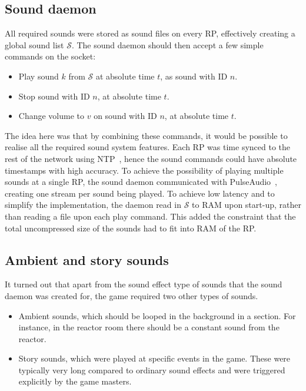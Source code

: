 \subsection{Sound daemon}

All required sounds were stored as sound files on every RP,
effectively creating a global sound list $\mathcal{S}$. The sound
daemon should then accept a few simple commands on the socket:
\begin{itemize}
\item Play sound $k$ from $\mathcal{S}$ at absolute time $t$, as sound with ID $n$.
\item Stop sound with ID $n$, at absolute time $t$.
\item Change volume to $v$ on sound with ID $n$, at absolute time $t$.
\end{itemize}

The idea here was that by combining these commands, it would be
possible to realise all the required sound system features. Each RP was time
synced to the rest of the network using NTP~\cite{ntp}, hence the
sound commands could have absolute timestamps with high accuracy. To
achieve the possibility of playing multiple sounds at a single RP, the
sound daemon communicated with PulseAudio~\cite{pulseaudio}, creating
one stream per sound being played. To achieve low latency and to
simplify the implementation, the daemon read in $\mathcal{S}$ to RAM
upon start-up, rather than reading a file upon each play command. This
added the constraint that the total uncompressed size of the sounds
had to fit into RAM of the RP\@.

\subsection{Ambient and story sounds}

It turned out that apart from the sound effect type of sounds that
the sound daemon was created for, the game required two other types of sounds.
\begin{itemize}
\item Ambient sounds, which should be looped in the background in a section. For instance, in the reactor room there should be a constant sound from the reactor.
\item Story sounds, which were played at specific events in the game. These were typically very long compared to ordinary sound effects and were triggered explicitly by the game masters.
\end{itemize}

